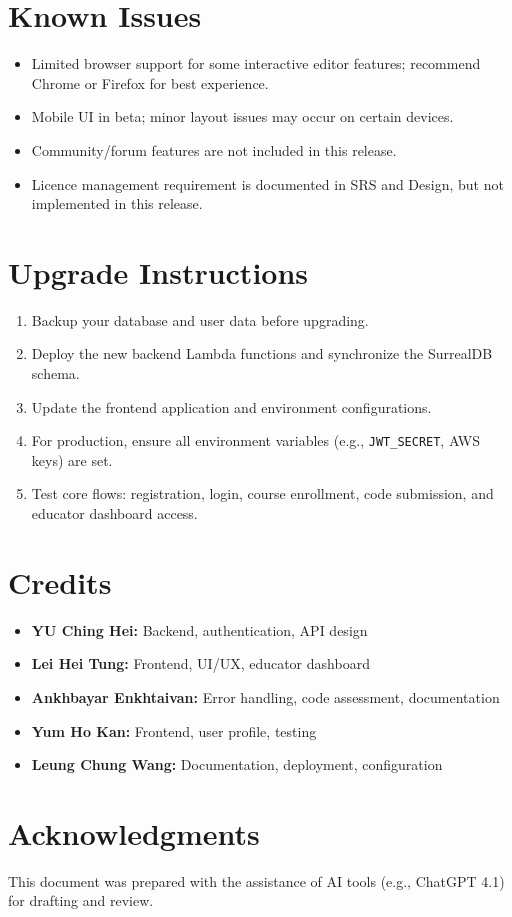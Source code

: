 \documentclass[a4paper,11pt]{scrartcl}
\begin{document}
\section{Known Issues}

\begin{itemize}[leftmargin=*]
    \item Limited browser support for some interactive editor features; recommend Chrome or Firefox for best experience.
    \item Mobile UI in beta; minor layout issues may occur on certain devices.
    \item Community/forum features are not included in this release.
    \item Licence management requirement is documented in SRS and Design, but not implemented in this release.
\end{itemize}



\section{Upgrade Instructions}

\begin{enumerate}[leftmargin=*]
    \item Backup your database and user data before upgrading.
    \item Deploy the new backend Lambda functions and synchronize the SurrealDB schema.
    \item Update the frontend application and environment configurations.
    \item For production, ensure all environment variables (e.g., \texttt{JWT\_SECRET}, AWS keys) are set.
    \item Test core flows: registration, login, course enrollment, code submission, and educator dashboard access.
\end{enumerate}

\section{Credits}

\begin{itemize}[leftmargin=*]
    \item \textbf{YU Ching Hei:} Backend, authentication, API design
    \item \textbf{Lei Hei Tung:} Frontend, UI/UX, educator dashboard
    \item \textbf{Ankhbayar Enkhtaivan:} Error handling, code assessment, documentation
    \item \textbf{Yum Ho Kan:} Frontend, user profile, testing
    \item \textbf{Leung Chung Wang:} Documentation, deployment, configuration
\end{itemize}

\section{Acknowledgments}
This document was prepared with the assistance of AI tools (e.g., ChatGPT 4.1) for drafting and review.
\end{document}
